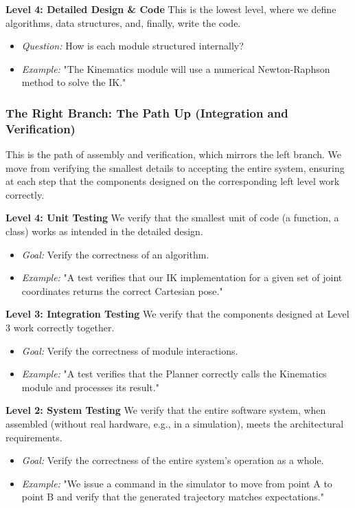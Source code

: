 \textbf{Level 4: Detailed Design \& Code}
This is the lowest level, where we define algorithms, data structures, and, finally, write the code.
\begin{itemize}
    \item \textit{Question:} How is each module structured internally?
    \item \textit{Example:} "The Kinematics module will use a numerical Newton-Raphson method to solve the IK."
\end{itemize}

\subsubsection{The Right Branch: The Path Up (Integration and Verification)}
This is the path of assembly and verification, which mirrors the left branch. We move from verifying the smallest details to accepting the entire system, ensuring at each step that the components designed on the corresponding left level work correctly.

\textbf{Level 4: Unit Testing}
We verify that the smallest unit of code (a function, a class) works as intended in the detailed design.
\begin{itemize}
    \item \textit{Goal:} Verify the correctness of an algorithm.
    \item \textit{Example:} "A test verifies that our IK implementation for a given set of joint coordinates returns the correct Cartesian pose."
\end{itemize}

\textbf{Level 3: Integration Testing}
We verify that the components designed at Level 3 work correctly together.
\begin{itemize}
    \item \textit{Goal:} Verify the correctness of module interactions.
    \item \textit{Example:} "A test verifies that the Planner correctly calls the Kinematics module and processes its result."
\end{itemize}

\textbf{Level 2: System Testing}
We verify that the entire software system, when assembled (without real hardware, e.g., in a simulation), meets the architectural requirements.
\begin{itemize}
    \item \textit{Goal:} Verify the correctness of the entire system's operation as a whole.
    \item \textit{Example:} "We issue a command in the simulator to move from point A to point B and verify that the generated trajectory matches expectations."
\end{itemize}

